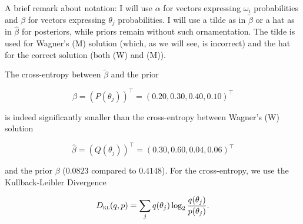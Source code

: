 \documentclass[11pt]{article}
\begin{document}

A brief remark about notation: I will use $\alpha$ for vectors
expressing $\omega_{i}$ probabilities and $\beta$ for vectors
expressing $\theta_{j}$ probabilities. I will use a tilde as in
$\tilde{\beta}$ or a hat as in $\hat{\beta}$ for posteriors, while
priors remain without such ornamentation. The tilde is used for
Wagner's (M) solution (which, as we will see, is incorrect) and the
hat for the correct solution (both (W) and (M)).

The cross-entropy between $\tilde{\beta}$ and the prior

\begin{equation}
  \label{eq:p14}
  \beta=(P(\theta_{j}))^{\intercal}=(0.20,0.30,0.40,0.10)^{\intercal}
\end{equation}

is indeed significantly smaller than the cross-entropy between
Wagner's (W) solution 

\begin{equation}
  \label{eq:p15}
  \hat{\beta}=(Q(\theta_{j}))^{\intercal}=(0.30,0.60,0.04,0.06)^{\intercal}
\end{equation}

and the prior $\beta$ ($0.0823$ compared to $0.4148$). For the
cross-entropy, we use the Kullback-Leibler Divergence

\begin{equation}
  \label{eq:kl}
  D_{\textsc{kl}}(q,p)=\sum_{j}q(\theta_{j})\log_{2}\frac{q(\theta_{j})}{p(\theta_{j})}.
\end{equation}
\end{document}
